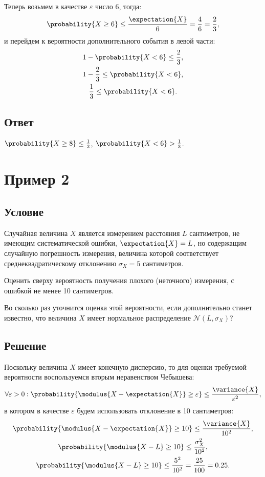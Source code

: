 Теперь возьмем в качестве $\varepsilon$ число 6, тогда:
\begin{equation}
    \probability{X \ge 6} \le \frac{\expectation{X}}{6} = \frac{4}{6} = \frac{2}{3} ,
\end{equation}
и перейдем к вероятности дополнительного события в левой части:
\begin{gather}
    1 - \probability{X < 6} \le \frac{2}{3} , \\
    1 - \frac{2}{3} \le \probability{X < 6} , \\
    \frac{1}{3} \le \probability{X < 6} .
\end{gather}

\subsection*{Ответ}
$\probability{X \ge 8} \le \frac{1}{2}$, $\probability{X < 6} > \frac{1}{3}$.


\section{Пример 2}

\subsection*{Условие}
Случайная величина $X$ является измерением расстояния $L$ сантиметров, не имеющим систематической ошибки, $\expectation{X} = L$, но содержащим случайную погрешность
измерения, величина которой соответствует среднеквадратическому отклонению $\sigma_X = 5$ сантиметров.

Оценить сверху вероятность получения плохого (неточного) измерения, с ошибкой не менее 10 сантиметров.

Во сколько раз уточнится оценка этой вероятности, если дополнительно станет известно, что величина $X$ имеет нормальное распределение $\mathcal{N} ( L, \sigma_X)$?

\subsection*{Решение}
Поскольку величина $X$ имеет конечную дисперсию, то для оценки требуемой вероятности воспользуемся вторым неравенством Чебышева:
\begin{equation}
    \forall \varepsilon > 0 : \probability{ \modulus{X - \expectation{X}} \ge \varepsilon } \le \frac{\variance{X}}{\varepsilon^2} ,
\end{equation}
в котором в качестве $\varepsilon$ будем использовать отклонение в 10 сантиметров:
\begin{gather}
    \probability{ \modulus{X - \expectation{X}} \ge 10 } \le \frac{\variance{X}}{10^2} , \\
    \probability{ \modulus{X - L} \ge 10 } \le \frac{\sigma_X^2}{10^2} , \\
    \probability{ \modulus{X - L} \ge 10 } \le \frac{5^2}{10^2} = \frac{25}{100} = 0.25 \label{2:bound}.
\end{gather}

